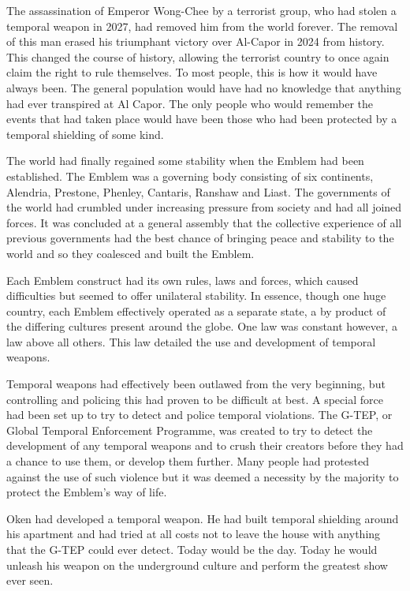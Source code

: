 The assassination of Emperor Wong-Chee by a terrorist group, who had stolen a temporal weapon in 2027, had removed him from the world forever.  The removal of this man erased his triumphant victory over Al-Capor in 2024 from history.  This changed the course of history, allowing the terrorist country to once again claim the right to rule themselves.  To most people, this is how it would have always been.  The general population would have had no knowledge that anything had ever transpired at Al Capor.  The only people who would remember the events that had taken place would have been those who had been protected by a temporal shielding of some kind.  

The world had finally regained some stability when the Emblem had been established.  The Emblem was a governing body consisting of six continents, Alendria, Prestone, Phenley, Cantaris, Ranshaw and Liast.  The governments of the world had crumbled under increasing pressure from society and had all joined forces.  It was concluded at a general assembly that the collective experience of all previous governments had the best chance of bringing peace and stability to the world and so they coalesced and built the Emblem.  

Each Emblem construct had its own rules, laws and forces, which caused difficulties but seemed to offer unilateral stability.  In essence, though one huge country, each Emblem effectively operated as a separate state, a by product of the differing cultures present around the globe.  One law was constant however, a law above all others.  This law detailed the use and development of temporal weapons.

Temporal weapons had effectively been outlawed from the very beginning, but controlling and policing this had proven to be difficult at best.  A special force had been set up to try to detect and police temporal violations.  The G-TEP, or Global Temporal Enforcement Programme, was created to try to detect the development of any temporal weapons and to crush their creators before they had a chance to use them, or develop them further.  Many people had protested against the use of such violence but it was deemed a necessity by the majority to protect the Emblem's way of life.

Oken had developed a temporal weapon.  He had built temporal shielding around his apartment and had tried at all costs not to leave the house with anything that the G-TEP could ever detect.  Today would be the day.  Today he would unleash his weapon on the underground culture and perform the greatest show ever seen.  

